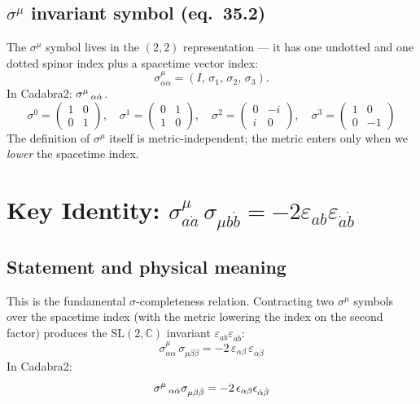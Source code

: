 \subsection{\texorpdfstring{$\sigma^\mu$}{sigma\^{}mu} invariant symbol (eq.~35.2)}

The $\sigma^\mu$ symbol lives in the $(2,2)$ representation --- it has
one undotted and one dotted spinor index plus a spacetime vector index:
\begin{equation}
  \sigma^\mu_{\alpha\dot{\alpha}} = (I,\,\sigma_1,\,\sigma_2,\,\sigma_3).
  \tag{35.2}
\end{equation}
In Cadabra2: $\sigma^{\mu}\,_{\alpha \dot{\alpha}}$.
\[
  \sigma^0 = \begin{pmatrix}1 & 0 \\ 0 & 1\end{pmatrix},\quad
  \sigma^1 = \begin{pmatrix}0 & 1 \\ 1 & 0\end{pmatrix},\quad
  \sigma^2 = \begin{pmatrix}0 & -i \\ i & 0\end{pmatrix},\quad
  \sigma^3 = \begin{pmatrix}1 & 0 \\ 0 & -1\end{pmatrix}
\]
The definition of $\sigma^\mu$ itself is metric-independent; the metric
enters only when we \emph{lower} the spacetime index.

\section{Key Identity: \texorpdfstring{$\sigma^\mu_{a\dot{a}}\,\sigma_{\mu b\dot{b}}
         = -2\varepsilon_{ab}\varepsilon_{\dot{a}\dot{b}}$}{eq 35.4}
         \quad [eq.~35.4]}

\subsection{Statement and physical meaning}

This is the fundamental $\sigma$-completeness relation.  Contracting
two $\sigma^\mu$ symbols over the spacetime index (with the metric lowering
the index on the second factor) produces the
SL$(2,\mathbb{C})$ invariant $\varepsilon_{ab}\varepsilon_{\dot{a}\dot{b}}$:
\begin{equation}
  \boxed{
    \sigma^\mu_{\alpha\dot{\alpha}}\,\sigma_{\mu\beta\dot{\beta}}
    = -2\,\varepsilon_{\alpha\beta}\,\varepsilon_{\dot{\alpha}\dot{\beta}}
  }
  \tag{35.4}
\end{equation}
In Cadabra2:
\[
  \sigma^{\mu}\,_{\alpha \dot{\alpha}} \sigma_{\mu \beta \dot{\beta}} = -2\,\epsilon_{\alpha \beta} \epsilon_{\dot{\alpha} \dot{\beta}}
\]


